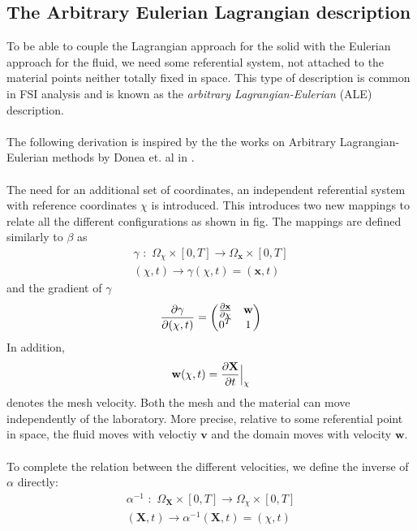 \subsection{The Arbitrary Eulerian Lagrangian description}
To be able to couple the Lagrangian approach for the solid with the Eulerian approach for the fluid, we need some referential system, not attached to the material points neither totally fixed in space. This type of description is common in FSI analysis and is known as the \textit{arbitrary Lagrangian-Eulerian} (ALE) description.
\\
\\The following derivation is inspired by the the works on Arbitrary Lagrangian-Eulerian methods by Donea et. al in \cite{Done04}. 
\\
\\
The need for an additional set of coordinates, an independent referential system with reference coordinates $\chi$ is introduced. This introduces two new mappings to relate all the different configurations as shown in fig. The mappings are defined similarly to $\beta$ as
\begin{align}
\gamma \,\, : \,\, \Omega_{\chi} \times [0,T] \rightarrow  \Omega_{\mathbf{x}} \times [0,T] \\
(\chi,t) \rightarrow \gamma(\chi,t) = (\mathbf{x},t)
\end{align}
and the gradient of $\gamma$
\begin{align}
\frac{\partial \gamma}{\partial (\chi,t)} = \begin{pmatrix} \frac{\partial \mathbf{x}}{\partial \chi} & \mathbf{w} \\
											0^T & 1
								\end{pmatrix} \label{gammaGradient}
\end{align}
In addition, 
\begin{align} \mathbf{w}(\chi,t) = \frac{\partial \mathbf{X}}{\partial t}\Big{|}_{\chi} \label{MeshVel}
\end{align}
denotes the mesh velocity. Both the mesh and the material can move independently of the laboratory. More precise, relative to some referential point in space, the fluid moves with veloctiy $\mathbf{v}$ and the domain moves with velocity $\mathbf{w}$. 
\\
\\
To complete the relation between the different velocities, we define the inverse of $\alpha$ directly: 
\begin{align}
\alpha^{-1} \,\, : \,\, \Omega_{\mathbf{X}} \times [0,T] \rightarrow  \Omega_{\chi} \times [0,T] \\
(\mathbf{X},t) \rightarrow \alpha^{-1}(\mathbf{X},t) = (\chi,t)
\end{align}
